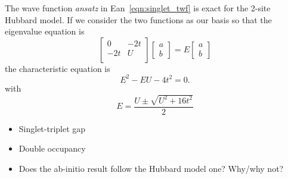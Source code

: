 \documentclass[12pt]{article}
\begin{document}
The wave function {\it ansatz} in Ean~\ref{eqn:singlet_twf} is exact for the 2-site Hubbard model. 
If we consider the two functions as our basis so that the eigenvalue equation is 
\begin{equation}
	\begin{bmatrix}
	  0 & -2t \\
	  -2t & U \\
    \end{bmatrix} 
\begin{bmatrix}
         a \\
         b
        \end{bmatrix} 
    =
E\begin{bmatrix}
         a \\
         b
        \end{bmatrix} 
\end{equation}
the characteristic equation  is 
\begin{equation}
E^2-EU-4t^2=0.
\end{equation}
with 
\begin{equation}
E=\frac{U\pm \sqrt{U^2+16t^2}}{2}	
\end{equation}


\begin{itemize}
\item Singlet-triplet gap
\item Double occupancy
\item Does the ab-initio result follow the Hubbard model one? Why/why not?
\end{itemize}
\end{document}
